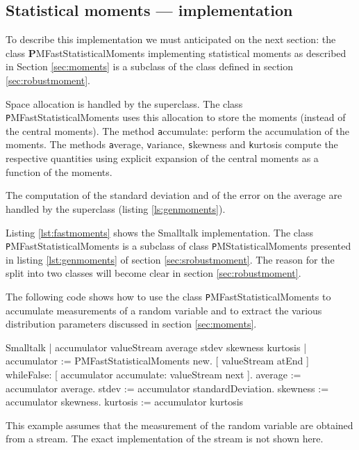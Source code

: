\subsection{Statistical moments --- implementation}
To describe this implementation we must anticipated on the next section: the class {\textbf
PMFastStatisticalMoments} implementing statistical moments as
described in Section \ref{sec:moments} is a subclass of the class
defined in section \ref{sec:robustmoment}.

Space allocation is handled by the superclass.
The class {\texttt PMFastStatisticalMoments} uses this allocation to store the moments
(instead of the central moments).
The method {\texttt accumulate:} perform the accumulation of the moments. The
methods {\texttt average}, {\texttt variance}, {\texttt skewness} and {\texttt
  kurtosis} compute the respective quantities using explicit expansion of the
central moments as a function of the moments.

The computation of the standard deviation and of the error on the
average are handled by the superclass (\cf listing \ref{ls:genmoments}).

\label{sec:smoments}Listing \ref{lst:fastmoments} shows the
Smalltalk implementation.
The class {\texttt PMFastStatisticalMoments} is a subclass of class {\texttt
PMStatisticalMoments} presented in listing \ref{lst:genmoments} of
section \ref{sec:srobustmoment}. The reason for the split into two
classes will become clear in section \ref{sec:robustmoment}.

The following code shows how to use the class {\texttt
PMFastStatisticalMoments} to accumulate measurements of a random
variable and to extract the various distribution parameters
discussed in section \ref{sec:moments}.

\begin{displaycode}{Smalltalk}
| accumulator valueStream average stdev skewness kurtosis |
accumulator := PMFastStatisticalMoments new.
[ valueStream atEnd ]
        whileFalse: [ accumulator accumulate: valueStream next ].
average := accumulator average.
stdev := accumulator standardDeviation.
skewness := accumulator skewness.
kurtosis := accumulator kurtosis
\end{displaycode}

This example assumes that the measurement of the random variable
are obtained from a stream. The exact implementation of the stream
is not shown here.

